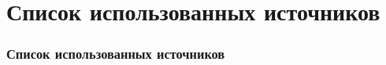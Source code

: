 \section{Список использованных источников}
\begin{frame}[allowframebreaks]
  \frametitle{Список использованных источников}
  \nocite{*}
  
  \footnotesize
  
\end{frame}